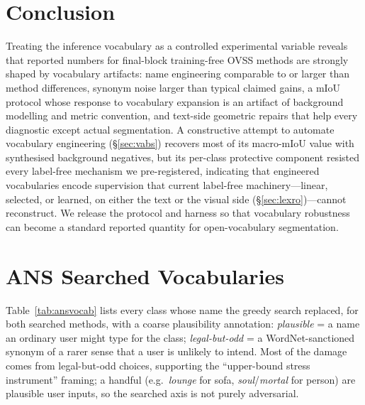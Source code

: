\documentclass[11pt]{article}
\newcommand{\miou}{mIoU}
\begin{document}
\section{Conclusion}

Treating the inference vocabulary as a controlled experimental variable reveals that
reported numbers for final-block training-free OVSS methods are strongly shaped by
vocabulary artifacts: name engineering comparable to or larger than method
differences, synonym noise larger than typical claimed gains, a \miou{} protocol whose
response to vocabulary expansion is an artifact of background modelling and metric
convention, and text-side geometric repairs that help every diagnostic except actual
segmentation. A constructive attempt to automate vocabulary engineering
(\S\ref{sec:vabs}) recovers most of its macro-\miou{} value with synthesised
background negatives, but its per-class protective component resisted every
label-free mechanism we pre-registered, indicating that engineered vocabularies
encode supervision that current label-free machinery---linear, selected, or
learned, on either the text or the visual side (\S\ref{sec:lexro})---cannot
reconstruct. We release the
protocol and harness so that vocabulary robustness can become a standard reported
quantity for open-vocabulary segmentation.

\appendix
\section{ANS Searched Vocabularies}
\label{app:ans}
Table~\ref{tab:ansvocab} lists every class whose name the greedy search
replaced, for both searched methods, with a coarse plausibility annotation:
\emph{plausible} = a name an ordinary user might type for the class;
\emph{legal-but-odd} = a WordNet-sanctioned synonym of a rarer sense that a
user is unlikely to intend. Most of the damage comes from legal-but-odd
choices, supporting the ``upper-bound stress instrument'' framing; a handful
(e.g.\ \emph{lounge} for sofa, \emph{soul}/\emph{mortal} for person) are plausible
user inputs, so the searched axis is not purely adversarial.
\end{document}
